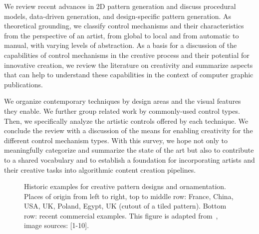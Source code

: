 We review recent advances in 2D pattern generation and discuss procedural models, data-driven generation, and design-specific pattern generation. As theoretical grounding, we classify control mechanisms and their characteristics from the perspective of an artist, from global to local and from automatic to manual, with varying levels of abstraction. As a basis for a discussion of the capabilities of control mechanisms in the creative process and their potential for innovative creation, we review the literature on creativity and summarize aspects that can help to understand these capabilities in the context of computer graphic publications.

We organize contemporary techniques by design areas and the visual features they enable. We further group related work by commonly-used control types. Then, we specifically analyze the artistic controls offered by each technique. 
We conclude the review with a discussion of the means for enabling creativity for the different control mechanism types. With this survey, we hope not only to meaningfully categorize and summarize the state of the art but also to contribute to a shared vocabulary and to establish a foundation for incorporating artists and their creative tasks into algorithmic content creation pipelines.

\begin{figure}
        \caption[Historic pattern examples]{\label{fig:historic_examples} Historic examples for creative pattern designs and ornamentation. Places of origin from left to right, top to middle row:  France, China, USA, UK, Poland, Egypt, UK (cutout of a tiled pattern). Bottom row: recent commercial examples. This figure is adapted from~\cite{gieseke_2017_ooo}, image sources: [1-10].}
\end{figure}
